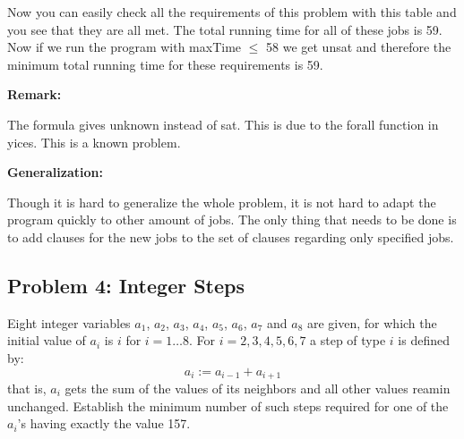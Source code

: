 \documentclass[12pt]{article}
\begin{document}
\vspace{3mm}

Now you can easily check all the requirements of this problem with this table and you see that they are all met. The total running time for all of these jobs is 59. Now if we run the program with maxTime $\leq$ 58 we get unsat and therefore the minimum total running time for these requirements is 59.

\vspace{3mm}

{\bf Remark:} 

The formula gives unknown instead of sat. This is due to the forall function in yices. This is a known problem.\\

\vspace{3mm}

{\bf Generalization:} 

Though it is hard to generalize the whole problem, it is not hard to adapt the program quickly to other amount of jobs. The only thing that needs to be done is to add clauses for the new jobs to the set of clauses regarding only specified jobs.\\

\vspace{3mm}

\subsection*{Problem 4: Integer Steps}

Eight integer variables $a_1$,  $a_2$,  $a_3$,  $a_4$,  $a_5$,  $a_6$,  $a_7$ and $a_8$ are given, for which the initial value of $a_i$ is $i$ for $i = 1 \ldots 8$. For $i = 2,3,4,5,6,7$ a step of type $i$ is defined by:
\[a_i := a_{i-1} + a_{i+1} \]
that is, $a_i$ gets the sum of the values of its neighbors and all other values reamin unchanged. Establish the minimum number of such steps required for one of the $a_{i}$'s having exactly the value 157.

\vspace{8mm}
\end{document}
